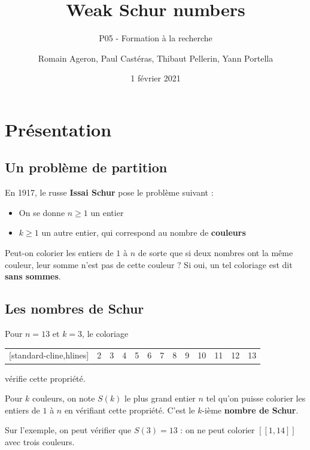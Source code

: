 \documentclass[graphics]{beamer}
\title[Weak Schur numbers]{Weak Schur numbers}
\subtitle{P05 - Formation à la recherche}
\author[R. Ageron, P. Castéras, T. Pellerin, Y. Portella]{Romain Ageron, Paul Castéras, Thibaut Pellerin, Yann Portella}
\date{1 février 2021}
\begin{document}
\begin{frame}
\titlepage
\end{frame}

\section{Présentation}
\subsection{Un problème de partition}
\begin{frame}
	En 1917, le russe \textbf{Issai Schur} pose le problème suivant :
	\pause
	\begin{itemize}
		\item On se donne \(n \geq 1\) un entier
		\item \(k \geq 1\) un autre entier, qui correspond au nombre de \textbf{couleurs}
	\end{itemize}
	\pause
	\begin{tcolorbox}[colback=green!5,colframe=green!40!black,title=Question]
		Peut-on colorier les entiers de \(1\) à \(n\) de sorte que si deux nombres ont la même couleur,
		leur somme n'est pas de cette couleur ? Si oui, un tel coloriage est dit \textbf{sans sommes}.
	\end{tcolorbox}
\end{frame}

\subsection{Les nombres de Schur}

\begin{frame}
	Pour \(n = 13\) et \(k = 3\), le coloriage \\
	\begin{center}
	\begin{NiceTabular}{|*{13}{c|}}[standard-cline,hlines]
		\CodeBefore
		 & 2 & 3 & 4 & 5 & 6 & 7 & 8 & 9 & 10 & 11 & 12 & 13\\
	\end{NiceTabular}
	\end{center}
	vérifie cette propriété.
	\pause
	\begin{tcolorbox}[colback=red!5,colframe=red!40!black,title=Définition]
		Pour \(k\) couleurs, on note \(S(k)\) le plus grand entier \(n\) tel qu'on puisse colorier les entiers de
		\(1\) à \(n\) en vérifiant cette propriété. C'est le \(k\)-ième \textbf{nombre de Schur}.
	\end{tcolorbox}
	\pause
	Sur l'exemple, on peut vérifier que \(S(3) = 13\) : on ne peut colorier \([\![1,14]\!]\) avec trois couleurs.
\end{frame}
\end{document}
